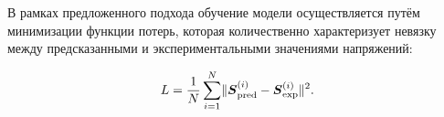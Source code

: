 В рамках предложенного подхода обучение модели осуществляется путём минимизации функции потерь, 
которая количественно характеризует невязку между предсказанными и экспериментальными значениями напряжений:

\begin{equation}
 L = \frac{1}{N}\sum_{i=1}^N \lVert \boldsymbol{S}^{(i)}_{\text{pred}} - \boldsymbol{S}^{(i)}_{\text{exp}} \rVert^2.
\label{eq:main_loss_function}
\end{equation}











